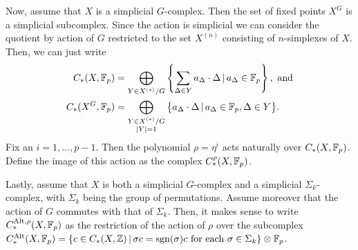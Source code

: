 \documentclass[a4paper,12pt]{amsart}
\begin{document}
Now, assume that $X$ is a simplicial $G$-complex.
Then the set of fixed points $X^G$ is a simplicial subcomplex.
Since the action is simplicial we can consider the quotient by action of $G$ restricted to the set $X^{(n)}$ consisting of $n$-simplexes of $X$.
Then, we can just write
\begin{align*}
    C_*(X,\mathbb{F}_p) &= \bigoplus_{Y\in X^{(*)}/G} \left\lbrace \sum_{\Delta \in Y}a_\Delta\cdot \Delta \,|\, a_\Delta\in \mathbb{F}_p\right\rbrace, \text{ and}\\
    C_*(X^G,\mathbb{F}_p) &= \bigoplus_{\substack{Y\in X^{(*)}/G \\ |Y| = 1}} \big\lbrace a_\Delta\cdot \Delta \,|\, a_\Delta\in \mathbb{F}_p, \Delta \in Y\big\rbrace.
\end{align*}
Fix an $i=1,\ldots,p-1$.
Then the polynomial $\rho = \eta^i$ acts naturally over $C_*(X,\mathbb{F}_p)$.
Define the image of this action as the complex $ C_*^\rho(X,\mathbb{F}_p)$.

Lastly, assume that $X$ is both a simplicial $G$-complex and a simplicial $\Sigma_k$-complex, with $\Sigma_k$ being the group of permutations.
Assume moreover that the action of $G$ commutes with that of $\Sigma_k$.
Then, it makes sense to write $C_*^{\textnormal{Alt},\rho}(X,\mathbb{F}_p)$ as the restriction of the action of $\rho$ over the subcomplex $C_*^{\textnormal{Alt}}(X,\mathbb{F}_p) = \lbrace c\in C_*(X,\mathbb{Z}) \,|\, \sigma c = \operatorname{sgn}(\sigma)c\text{ for each }\sigma\in\Sigma_k\rbrace \otimes \mathbb{F}_p$. %
\end{document}
